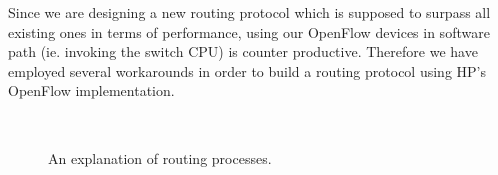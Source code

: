 Since we are designing a new routing protocol which is supposed to surpass all
existing ones in terms of performance, using our OpenFlow devices in software
path (ie. invoking the switch CPU) is counter productive. Therefore we have employed several workarounds in
order to build a routing protocol using HP's OpenFlow implementation.

\begin{figure}
  \centering
  \\                
  \caption{An explanation of routing processes.}
  \label{fig:routing}
\end{figure}


